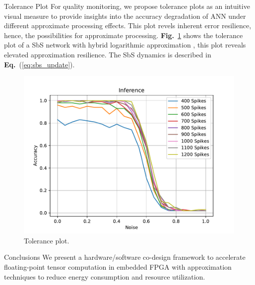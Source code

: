 \documentclass[final]{beamer}
\newlength{\onecolwid}
\newcommand\fig[1]{\textbf{Fig.}~\ref{#1}}
\newcommand\equ[1]{\textbf{Eq.}~(\ref{#1})}
\begin{document}
\begin{frame}[t]
\begin{columns}[t]
\begin{column}{\onecolwid} %


\begin{block}{Tolerance Plot}
	For quality monitoring, we propose tolerance plots as an intuitive
	visual measure to provide insights into the accuracy degradation of
	ANN under different approximate processing effects. This plot revels inherent error resilience, hence, the
	possibilities for approximate processing. \fig{fig:tolerance} shows the tolerance plot of a SbS network with hybrid logarithmic approximation \cite{nevarez2021accelerating}, this plot reveals elevated approximation resilience. The SbS dynamics is described in \equ{eq:sbs_update}.
	\begin{figure}
		\includegraphics[width=\linewidth]{../figures/accuracy_vs_spike_log.pdf}
		\caption{Tolerance plot.}
		\label{fig:tolerance}
	\end{figure}
\end{block}

\begin{block}{Conclusions}
We present a hardware/software co-design framework to accelerate floating-point tensor computation in embedded FPGA with approximation techniques to reduce energy consumption and resource utilization.

\end{block}


\end{column}
\end{columns}
\end{frame}
\end{document}
